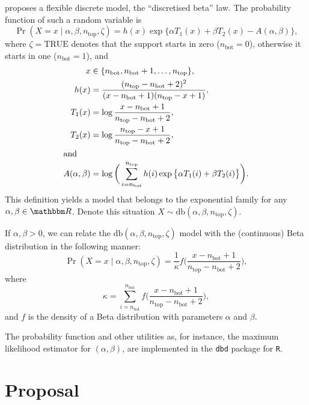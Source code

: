\documentclass[12pt]{article}
\begin{document}
\citet{ANewVersatileDiscreteDistribution} proposes a flexible discrete model, the ``discretised beta'' law.
The probability function of such a random variable is
\begin{equation}
\Pr(X  = x \mid \alpha, \beta, n_{\text{top}}, \zeta) = h(x) \exp\big\{ \alpha T_1(x) + \beta T_2(x) - A(\alpha, \beta) \big\},
\label{Eq:Probdb}
\end{equation}
where $\zeta=\text{TRUE}$ denotes that the support starts in zero ($n_{\text{bot}}=0$), otherwise it starts in one ($n_{\text{bot}}=1$), and
\begin{align}
x &\in \{n_{\text{bot}}, n_{\text{bot}}+1, \dots, n_{\text{top}}\},\\
h(x) & =\frac{(n_{\text{top}} - n_{\text{bot}}+2)^2}{
(x-n_{\text{bot}}+1)	(n_{\text{top}}-x+1)	},\\
T_1(x) &= \log\frac{x-n_{\text{bot}}+1}{n_{\text{top}}-n_{\text{bot}}+2}, \\
T_2(x) &= \log\frac{n_{\text{top}}-x+1}{n_{\text{top}}-n_{\text{bot}}+2}, \\
\intertext{and}
A(\alpha,\beta) &= \log \bigg(
\sum_{i=n_{\text{bot}}}^{n_{\text{top}}} h(i) \exp\big\{ \alpha T_1(i) + \beta T_2(i)\big\}
\bigg).
\end{align}
This definition yields a model that belongs to the exponential family for any $\alpha,\beta\in\mathbbm R$.
Denote this situation $X\sim\text{db}(\alpha,\beta, n_{\text{top}},\zeta)$.

If $\alpha,\beta>0$, we can relate the $\text{db}(\alpha,\beta, n_{\text{top}},\zeta)$ model with the (continuous) Beta distribution in the following manner:
\begin{equation}
\Pr(X=x \mid \alpha, \beta, n_{\text{top}}, \zeta) = 
\frac{1}{\kappa} f\Big(
\frac{x-n_{\text{bot}}+1}{n_{\text{top}}-n_{\text{bot}}+2}
\Big),
\label{Eq:Probdb}
\end{equation}
where
$$
\kappa = \sum_{i=n_{\text{bot}}}^{n_{\text{bot}}} f\Big(
\frac{x-n_{\text{bot}}+1}{n_{\text{top}}-n_{\text{bot}}+2}
\Big),
$$
and $f$ is the density of a Beta distribution with parameters $\alpha$ and $\beta$.

The probability function and other utilities as, for instance, the maximum likelihood estimator for $(\alpha,\beta)$, are implemented in the \texttt{dbd} package for \texttt{R}.

\section{Proposal}
\end{document}
